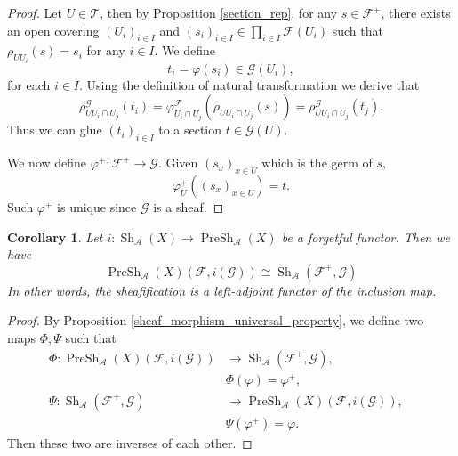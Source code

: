 \documentclass{article}
\newtheorem{corollary}{Corollary}[section]
\numberwithin{equation}{section}
\DeclareMathOperator{\PreSh}{PreSh}
\DeclareMathOperator{\Sh}{Sh}
\begin{document}
\begin{proof}
Let $U\in\mathcal{T}$, then by Proposition \ref{section_rep}, for any $s\in\mathcal{F}^+$, there exists an open covering $(U_i)_{i\in I}$ and $(s_i)_{i\in I}\in\prod_{i\in I}\mathcal{F}(U_i)$ such that $\rho_{UU_i}(s)=s_i$ for any $i\in I$. We define
\begin{equation*}
t_i = \varphi(s_i)\in\mathcal{G}(U_i),
\end{equation*}
for each $i\in I$. Using the definition of natural transformation we derive that
\begin{equation*}
\rho^{\mathcal{G}}_{UU_i\cap U_j}(t_i) = \varphi^{\mathcal{F}}_{U_i\cap U_j}(\rho_{UU_i\cap U_j}(s))=\rho^{\mathcal{G}}_{UU_i\cap U_j}(t_j).
\end{equation*}
Thus we can glue $(t_i)_{i\in I}$ to a section $t\in\mathcal{G}(U)$.\\
\par We now define $\varphi^+:\mathcal{F}^+\to\mathcal{G}$. Given $(s_x)_{x\in U}$ which is the germ of $s$,
\begin{equation*}
\varphi^+_{U}((s_x)_{x\in U}) = t.
\end{equation*}
Such $\varphi^+$ is unique since $\mathcal{G}$ is a sheaf.
\end{proof}

\begin{corollary}
Let $i:\Sh_\mathcal{A}(X)\to\PreSh_\mathcal{A}(X)$ be a forgetful functor. Then we have
\begin{equation*}
\PreSh_\mathcal{A}(X)(\mathcal{F},i(\mathcal{G})) \cong \Sh_{\mathcal{A}}(\mathcal{F}^+,\mathcal{G})
\end{equation*}
In other words, the sheafification is a left-adjoint functor of the inclusion map.
\end{corollary}

\begin{proof}
By Proposition \ref{sheaf_morphism_universal_property}, we define two maps $\Phi,\Psi$ such that
\begin{align*}
\Phi:\PreSh_\mathcal{A}(X)(\mathcal{F},i(\mathcal{G})) &\to \Sh_{\mathcal{A}}(\mathcal{F}^+,\mathcal{G}),&\\
& \Phi(\varphi) = \varphi^+,\\
\Psi:\Sh_{\mathcal{A}}(\mathcal{F}^+,\mathcal{G})&\to\PreSh_\mathcal{A}(X)(\mathcal{F},i(\mathcal{G})),&\\
 &\Psi(\varphi^+)  = \varphi.
\end{align*}
Then these two are inverses of each other.
\end{proof}
\end{document}
